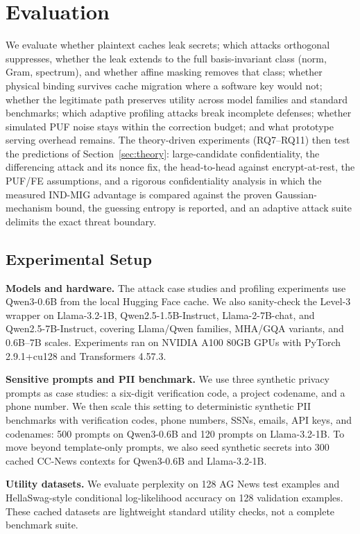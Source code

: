 \section{Evaluation}
\label{sec:evaluation}

We evaluate whether plaintext caches leak secrets; which attacks orthogonal \sys{} suppresses, whether the leak extends to the full basis-invariant class (norm, Gram, spectrum), and whether affine masking removes that class; whether physical binding survives cache migration where a software key would not; whether the legitimate path preserves utility across model families and standard benchmarks; which adaptive profiling attacks break incomplete defenses; whether simulated PUF noise stays within the correction budget; and what prototype serving overhead remains. The theory-driven experiments (RQ7--RQ11) then test the predictions of Section~\ref{sec:theory}: large-candidate confidentiality, the differencing attack and its nonce fix, the head-to-head against encrypt-at-rest, the PUF/FE assumptions, and a rigorous confidentiality analysis in which the measured \textsc{IND-MIG} advantage is compared against the proven Gaussian-mechanism bound, the guessing entropy is reported, and an adaptive attack suite delimits the exact threat boundary.

\subsection{Experimental Setup}

\textbf{Models and hardware.} The attack case studies and profiling experiments use Qwen3-0.6B from the local Hugging Face cache. We also sanity-check the Level-3 wrapper on Llama-3.2-1B, Qwen2.5-1.5B-Instruct, Llama-2-7B-chat, and Qwen2.5-7B-Instruct, covering Llama/Qwen families, MHA/GQA variants, and 0.6B--7B scales. Experiments ran on NVIDIA A100 80GB GPUs with PyTorch 2.9.1+cu128 and Transformers 4.57.3.

\textbf{Sensitive prompts and PII benchmark.} We use three synthetic privacy prompts as case studies: a six-digit verification code, a project codename, and a phone number. We then scale this setting to deterministic synthetic PII benchmarks with verification codes, phone numbers, SSNs, emails, API keys, and codenames: 500 prompts on Qwen3-0.6B and 120 prompts on Llama-3.2-1B. To move beyond template-only prompts, we also seed synthetic secrets into 300 cached CC-News contexts for Qwen3-0.6B and Llama-3.2-1B.

\textbf{Utility datasets.} We evaluate perplexity on 128 AG News test examples and HellaSwag-style conditional log-likelihood accuracy on 128 validation examples. These cached datasets are lightweight standard utility checks, not a complete benchmark suite.

